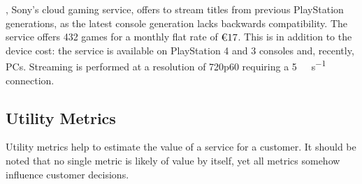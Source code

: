
\psnow, Sony's cloud gaming service, offers to stream titles from previous
PlayStation generations, as the latest console generation lacks
backwards compatibility.
The service offers 432 games for a monthly flat rate of
$\text{\texteuro}17$.
This is in addition to
the device cost: the service is available on PlayStation 4 and 3
consoles and, recently, \glspl{PC}.
Streaming is performed at a resolution of
720p60 requiring a \SI{5}{\mega\bit\per\second}
connection.



%


\subsection{Utility Metrics}

Utility metrics help to estimate the value of a service for a customer.
It should be noted that no single metric is likely of value by itself,
yet all metrics somehow influence customer decisions.

